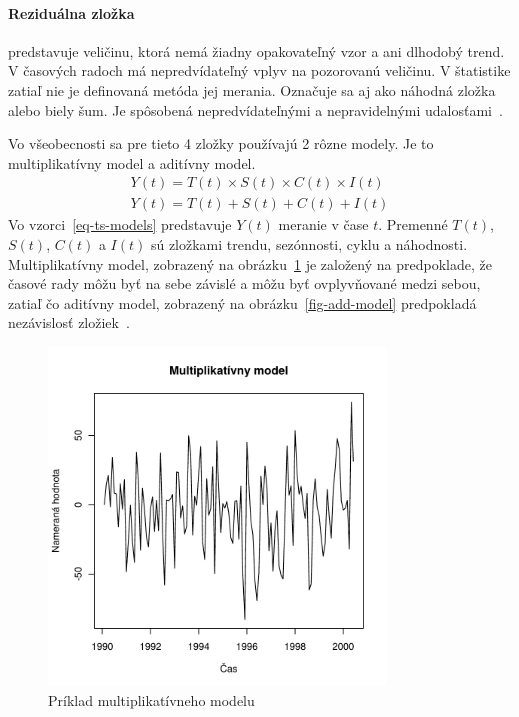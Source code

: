 \documentclass[a4paper,slovak,12pt,appendix]{article}
\begin{document}
\paragraph{Reziduálna zložka} predstavuje veličinu, ktorá nemá žiadny
opakovateľný vzor a ani dlhodobý trend. V časových radoch má nepredvídateľný
vplyv na pozorovanú veličinu. V štatistike zatiaľ nie je definovaná metóda jej
merania. Označuje sa aj ako náhodná zložka alebo biely šum. Je spôsobená
nepredvídateľnými a nepravidelnými udalosťami~\cite{Agrawal2013}.

Vo všeobecnosti sa pre tieto 4 zložky používajú 2 rôzne modely. Je to
multiplikatívny model a aditívny model.
\begin{equation}
  \begin{split}
    Y(t) = T(t) \times S(t) \times C(t) \times I(t)
    \\
    Y(t) = T(t) + S(t) + C(t) + I(t)
  \end{split}
  \label{eq-ts-models}
\end{equation}
Vo vzorci~\ref{eq-ts-models} predstavuje $Y(t)$ meranie v čase $t$. Premenné
$T(t)$, $S(t)$, $C(t)$ a $I(t)$ sú zložkami trendu, sezónnosti,
cyklu a náhodnosti. Multiplikatívny model, zobrazený na
obrázku~\ref{fig-multi-model} je založený na predpoklade, že časové rady môžu
byť na sebe závislé a môžu byť ovplyvňované medzi sebou, zatiaľ čo aditívny
model, zobrazený na obrázku~\ref{fig-add-model} predpokladá nezávislosť
zložiek~\cite{Agrawal2013}.

\begin{figure}[!ht]
  \centering
  \includegraphics[width=0.8\textwidth]{multi_model.pdf}
  \caption{Príklad multiplikatívneho modelu}
  \label{fig-multi-model}
\end{figure}
\end{document}
